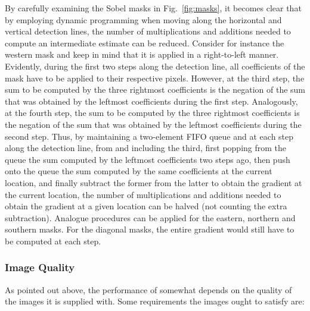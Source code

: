 By carefully examining the Sobel masks in Fig.~\ref{fig:masks}, it
becomes clear that by employing dynamic programming when moving along
the horizontal and vertical detection lines, the number of
multiplications and additions needed to compute an intermediate
estimate can be reduced.  Consider for instance the western mask and
keep in mind that it is applied in a right-to-left manner.  Evidently,
during the first two steps along the detection line, all coefficients
of the mask have to be applied to their respective pixels.  However,
at the third step, the sum to be computed by the three rightmost
coefficients is the negation of the sum that was obtained by the
leftmost coefficients during the first step.  Analogously, at the
fourth step, the sum to be computed by the three rightmost
coefficients is the negation of the sum that was obtained by the
leftmost coefficients during the second step.  Thus, by maintaining a
two-element FIFO queue and at each step along the detection line, from
and including the third, first popping from the queue the sum computed
by the leftmost coefficients two steps ago, then push onto the queue
the sum computed by the same coefficients at the current location, and
finally subtract the former from the latter to obtain the gradient at
the current location, the number of multiplications and additions
needed to obtain the gradient at a given location can be halved (not
counting the extra subtraction).  Analogue procedures can be applied
for the eastern, northern and southern masks.  For the diagonal masks,
the entire gradient would still have to be computed at each step.

\subsubsection{Image Quality}

As pointed out above, the performance of {\octopus} somewhat depends
on the quality of the images it is supplied with.  Some requirements
the images ought to satisfy are:

